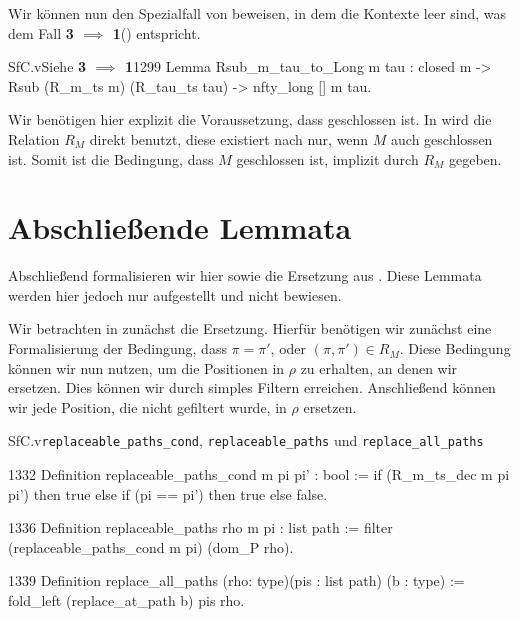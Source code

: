 Wir können nun den Spezialfall von  beweisen, in dem die Kontexte leer sind, was dem Fall \textbf{3 $\implies$ 1}() entspricht.
\begin{code}{SfC.v}{Siehe  \textbf{3 $\implies$ 1}}{1299}
Lemma Rsub_m_tau_to_Long {m tau} : closed m -> 
    Rsub (R_m_ts m) (R_tau_ts tau) -> nfty_long [] m tau.
\end{code}
\begin{remark}
    Wir benötigen hier explizit die Voraussetzung, dass  geschlossen ist. In  wird die Relation $R_M$ direkt benutzt, diese existiert nach  nur, wenn $M$ auch geschlossen ist. Somit ist die Bedingung, dass $M$ geschlossen ist, implizit durch $R_M$ gegeben.
\end{remark}

\section{Abschließende Lemmata}
Abschließend formalisieren wir hier  sowie die Ersetzung aus . Diese Lemmata werden hier jedoch nur aufgestellt und nicht bewiesen.

Wir betrachten in  zunächst die Ersetzung. Hierfür benötigen wir zunächst eine Formalisierung der Bedingung, dass $\pi=\pi'$, oder $(\pi,\pi')\in R_M$. Diese Bedingung können wir nun nutzen, um die Positionen in $\rho$ zu erhalten, an denen wir ersetzen. Dies können wir durch simples Filtern erreichen. Anschließend können wir jede Position, die nicht gefiltert wurde, in $\rho$ ersetzen.

\begin{multicode}{SfC.v}{}{\texttt{replaceable\_paths\_cond}, \texttt{replaceable\_paths} und \texttt{replace\_all\_paths}}
\begin{mcode}{1332}
Definition replaceable_paths_cond m pi pi' : bool :=
    if (R_m_ts_dec m pi pi') then true else
      if (pi == pi') then true else false.
\end{mcode}
\begin{mcode}{1336}
Definition replaceable_paths rho m pi : list path :=
    filter (replaceable_paths_cond m pi) (dom_P rho).
\end{mcode}
\begin{mcode}{1339}
Definition replace_all_paths 
    (rho: type)(pis : list path) (b : type) :=
  fold_left (replace_at_path b) pis rho.
\end{mcode}
\end{multicode}

